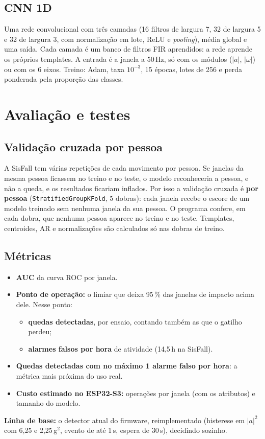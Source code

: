 \documentclass[12pt,a4paper]{article}
\newcommand{\code}[1]{\texttt{#1}}
\newcommand{\amag}{|a|}
\newcommand{\wmag}{|\omega|}
\begin{document}
\subsection{CNN 1D}
Uma rede convolucional \cite{pytorch} com três camadas (16 filtros de largura 7, 32 de
largura 5 e 32 de largura 3, com normalização em lote, ReLU e \emph{pooling}), média
global e uma saída. Cada camada é um banco de filtros FIR aprendidos: a rede aprende os
próprios templates. A entrada é a janela a 50\,Hz, só com os módulos ($\amag$, $\wmag$)
ou com os 6 eixos. Treino: Adam, taxa $10^{-3}$, 15 épocas, lotes de 256 e perda
ponderada pela proporção das classes.

\section{Avaliação e testes}\label{sec:avaliacao}
\subsection{Validação cruzada por pessoa}
A SisFall tem várias repetições de cada movimento por pessoa. Se janelas da mesma
pessoa ficassem no treino e no teste, o modelo reconheceria a pessoa, e não a queda,
e os resultados ficariam inflados. Por isso a validação cruzada é \textbf{por pessoa}
(\code{StratifiedGroupKFold}, 5 dobras): cada janela recebe o escore de um modelo
treinado sem nenhuma janela da sua pessoa. O programa confere, em cada dobra, que
nenhuma pessoa aparece no treino e no teste. Templates, centroides, AR e normalizações
são calculados só nas dobras de treino.

\subsection{Métricas}\label{sec:metricas}
\begin{itemize}[leftmargin=1.5em]
\item \textbf{AUC} da curva ROC por janela.
\item \textbf{Ponto de operação:} o limiar que deixa 95\,\% das janelas de impacto
  acima dele. Nesse ponto:
  \begin{itemize}
  \item \textbf{quedas detectadas}, por ensaio, contando também as que o gatilho perdeu;
  \item \textbf{alarmes falsos por hora} de atividade (14,5\,h na SisFall).
  \end{itemize}
\item \textbf{Quedas detectadas com no máximo 1 alarme falso por hora}: a métrica mais
  próxima do uso real.
\item \textbf{Custo estimado no ESP32-S3:} operações por janela (com os atributos) e
  tamanho do modelo.
\end{itemize}
\textbf{Linha de base:} o detector atual do firmware, reimplementado (histerese em
$\amag^2$ com 6,25 e 2,25\,g$^2$, evento de até 1\,s, espera de 30\,s), decidindo
sozinho.
\end{document}
